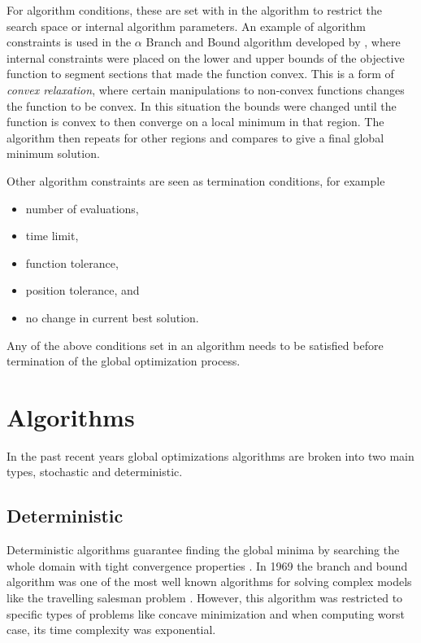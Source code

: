 For algorithm conditions, these are set with in the algorithm to restrict the search space or internal algorithm parameters. An example of algorithm constraints is used in the $\alpha$ Branch and Bound algorithm developed by \cite{}, where internal constraints were placed on the lower and upper bounds of the objective function to segment sections that made the function convex. This is a form of \textit{convex relaxation}, where certain manipulations to non-convex functions
changes the function to be convex. In this situation the bounds were changed until the function is convex to then converge on a local minimum in that region. The algorithm then repeats for other regions and compares to give a final global minimum solution. 

Other algorithm constraints are seen as termination conditions, for example
\begin{itemize}
    \item number of evaluations,
    \item time limit,
    \item function tolerance,
    \item position tolerance, and
    \item no change in current best solution.
\end{itemize}

Any of the above conditions set in an algorithm needs to be satisfied before termination of the global optimization process. 

\section{Algorithms}
In the past recent years global optimizations algorithms are broken into two main types, stochastic and deterministic. 
\subsection{Deterministic}
Deterministic algorithms guarantee finding the global minima by searching the whole
domain with tight convergence properties \cite{Pinter2002}. In 1969 the branch and bound algorithm \cite{Liberti2000} was one of the most well known algorithms for solving complex models like the travelling salesman problem \cite{Liberti2000}. However, this algorithm was restricted to specific types of problems like concave minimization and when computing worst case, its time complexity was exponential.
